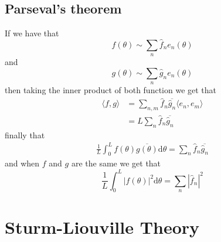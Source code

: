 \documentclass{article}
\begin{document}
\subsection{Parseval's theorem}
	If we have that \[f(\theta)\sim \sum_n\hat f_n e_n(\theta) \]
	and
	\[
	  g(\theta)\sim \sum_n\hat g_n e_n(\theta)
	\]
	then taking the inner product of both function we get that
	\begin{align*}
		\langle f,g\rangle &= \sum_{n,m}\hat f_n\overline{\hat g_n}\langle e_n,e_m\rangle\\
				   &= L\sum_n\hat f_n \overline{\hat g_n}
	\end{align*}
	finally that
	\begin{align*}
		\frac 1L\int_0^L f(\theta)\overline{g(\theta)}\mathrm d\theta=\sum_n \hat f_n \overline{\hat g_n}
	\end{align*}
	 and when $ f $ and $ g $ are the same we get that
	 \[
	   \frac 1L\int_0^L|f(\theta)|^2\mathrm d\theta=\sum_n|\hat f_n|^2
	 \]
	 \section{Sturm-Liouville Theory}
\end{document}

